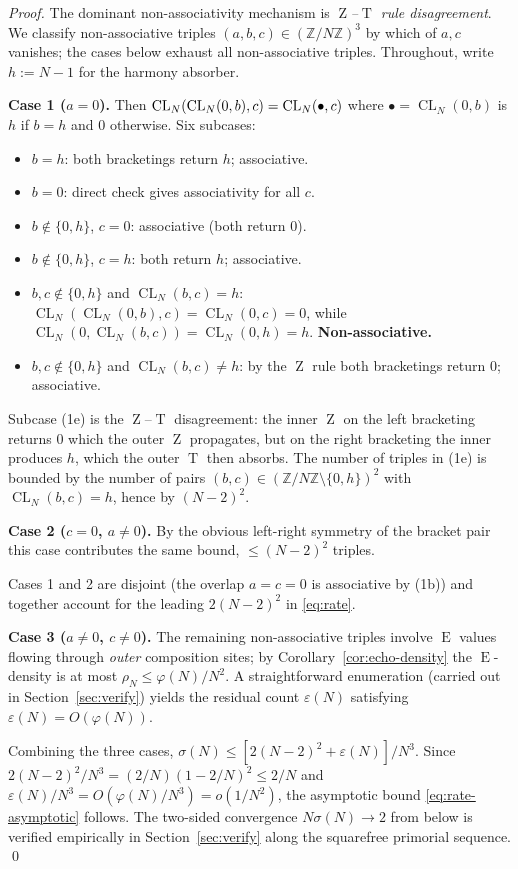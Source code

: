 \documentclass[11pt,reqno]{amsart}
\theoremstyle{plain}
\theoremstyle{definition}
\theoremstyle{remark}
\DeclareMathOperator{\CL}{CL}
\DeclareMathOperator{\ECHO}{E}
\DeclareMathOperator{\HARM}{T}
\DeclareMathOperator{\VOID}{Z}
\newcommand{\ZN}{\mathbb{Z}/N\mathbb{Z}}
\begin{document}
\begin{proof}
The dominant non-associativity mechanism is \emph{$\VOID$--$\HARM$ rule
disagreement}. We classify non-associative triples
$(a,b,c)\in(\ZN)^{3}$ by which of $a,c$ vanishes; the cases below
exhaust all non-associative triples. Throughout, write $h:=N-1$ for
the harmony absorber.

\medskip
\noindent\textbf{Case 1 ($a=0$).} Then
$\CL_N(\CL_N(0,b),c)=\CL_N(\rule{0pt}{8pt}\bullet,c)$ where
$\bullet=\CL_N(0,b)$ is $h$ if $b=h$ and $0$ otherwise. Six subcases:
\begin{itemize}\setlength\itemsep{0pt}
\item[(1a)] $b=h$: both bracketings return $h$; associative.
\item[(1b)] $b=0$: direct check gives associativity for all $c$.
\item[(1c)] $b\notin\{0,h\}$, $c=0$: associative (both return $0$).
\item[(1d)] $b\notin\{0,h\}$, $c=h$: both return $h$; associative.
\item[(1e)] $b,c\notin\{0,h\}$ and $\CL_N(b,c)=h$:
  $\CL_N(\CL_N(0,b),c)=\CL_N(0,c)=0$, while
  $\CL_N(0,\CL_N(b,c))=\CL_N(0,h)=h$. \textbf{Non-associative.}
\item[(1f)] $b,c\notin\{0,h\}$ and $\CL_N(b,c)\neq h$: by the
  $\VOID$ rule both bracketings return $0$; associative.
\end{itemize}
Subcase (1e) is the $\VOID$--$\HARM$ disagreement: the inner $\VOID$
on the left bracketing returns $0$ which the outer $\VOID$ propagates,
but on the right bracketing the inner produces $h$, which the outer
$\HARM$ then absorbs. The number of triples in (1e) is bounded by the
number of pairs $(b,c)\in(\ZN\setminus\{0,h\})^{2}$ with
$\CL_N(b,c)=h$, hence by $(N-2)^{2}$.

\medskip
\noindent\textbf{Case 2 ($c=0$, $a\neq 0$).} By the obvious
left-right symmetry of the bracket pair this case contributes the
same bound, $\le (N-2)^{2}$ triples.

Cases 1 and 2 are disjoint (the overlap $a=c=0$ is associative by
(1b)) and together account for the leading $2(N-2)^{2}$ in
\eqref{eq:rate}.

\medskip
\noindent\textbf{Case 3 ($a\neq 0$, $c\neq 0$).} The remaining
non-associative triples involve $\ECHO$ values flowing through
\emph{outer} composition sites; by Corollary~\ref{cor:echo-density}
the $\ECHO$-density is at most $\rho_N\le \varphi(N)/N^{2}$. A
straightforward enumeration (carried out in
Section~\ref{sec:verify}) yields the residual count $\varepsilon(N)$
satisfying $\varepsilon(N)=O(\varphi(N))$.

\medskip
Combining the three cases,
$\sigma(N)\le[2(N-2)^{2}+\varepsilon(N)]/N^{3}$. Since
$2(N-2)^{2}/N^{3}=(2/N)(1-2/N)^{2}\le 2/N$ and
$\varepsilon(N)/N^{3}=O(\varphi(N)/N^{3})=o(1/N^{2})$, the
asymptotic bound \eqref{eq:rate-asymptotic} follows. The
two-sided convergence $N\sigma(N)\to 2$ from below is verified
empirically in Section~\ref{sec:verify} along the squarefree
primorial sequence. \qed
\end{proof}
\end{document}

